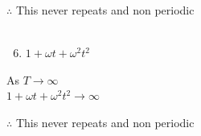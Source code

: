 \documentclass[journal,12pt,twocolumn]{IEEEtran}
\theoremstyle{remark}
\begin{document}
    $\therefore$  This never repeats and non periodic\\
    \\
    \begin{enumerate}
 \setcounter{enumi}{5} 
    \item $1+\omega t+\omega^2t^2$\\
\end{enumerate}
 \begin{center}
  As $T\to\infty$\\
  $1+\omega t+\omega^2t^2  \to \infty$\\
  \end{center}
  $\therefore$ This never repeats and non periodic\\
 \newpage
 
 \renewcommand{\thefigure}{\theenumi}
 \renewcommand{\thetable}{\theenumi}
 
\end{document}
